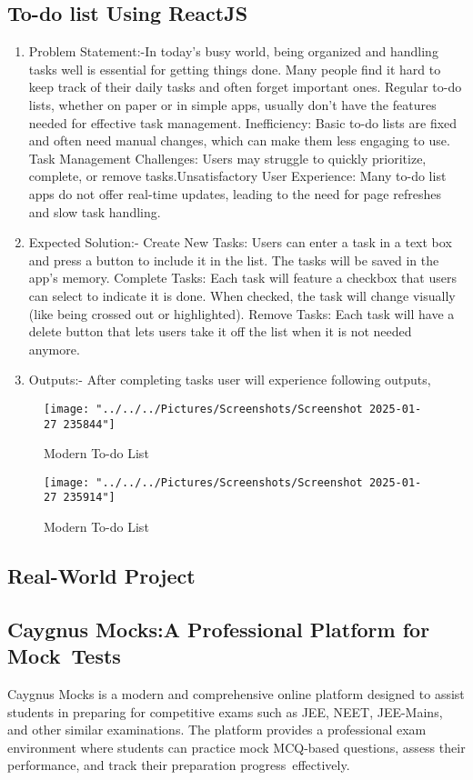 \subsection*{To-do list Using ReactJS}
\begin{enumerate}
\item Problem Statement:-In today's busy world, being organized and handling tasks well is essential for getting things done. Many people find it hard to keep track of their daily tasks and often forget important ones. Regular to-do lists, whether on paper or in simple apps, usually don't have the features needed for effective task management.
Inefficiency: Basic to-do lists are fixed and often need manual changes, which can make them less engaging to use.
Task Management Challenges: Users may struggle to quickly prioritize, complete, or remove tasks.Unsatisfactory User Experience: Many to-do list apps do not offer real-time updates, leading to the need for page refreshes and slow task handling.
\item Expected Solution:- Create New Tasks: Users can enter a task in a text box and press a button to include it in the list. The tasks will be saved in the app's memory.  
Complete Tasks: Each task will feature a checkbox that users can select to indicate it is done. When checked, the task will change visually (like being crossed out or highlighted).  
Remove Tasks: Each task will have a delete button that lets users take it off the list when it is not needed anymore.
\item Outputs:- After completing tasks user will experience following outputs,
\end{enumerate}
\newpage
\begin{figure}[tbph]
\centering
\texttt{[image: "../../../Pictures/Screenshots/Screenshot 2025-01-27 235844"]}
\caption{Modern To-do List}
\label{fig:screenshot-2025-01-27-235844}
\end{figure}
\begin{figure}[tbph]
\centering
\texttt{[image: "../../../Pictures/Screenshots/Screenshot 2025-01-27 235914"]}
\caption{Modern To-do List}
\label{fig:screenshot-2025-01-27-235914}
\end{figure}
\newpage
\subsection{Real-World Project}
\subsection*{Caygnus Mocks:A Professional Platform for Mock Tests}
Caygnus Mocks is a modern and comprehensive online platform designed to assist students in preparing for competitive exams such as JEE, NEET, JEE-Mains, and other similar examinations. The platform provides a professional exam environment where students can practice mock MCQ-based questions, assess their performance, and track their preparation progress effectively.
